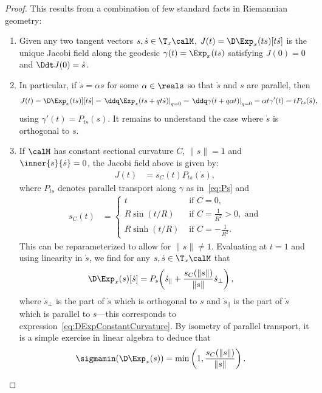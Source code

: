 \begin{proof}
	This results from a combination of few standard facts in Riemannian geometry:
	\begin{enumerate}
		\item \citep[Prop.~10.10]{lee2018riemannian} Given any two tangent vectors $s, \dot s \in \T_x\calM$, $J(t) = \D\Exp_x(ts)[t\dot s]$ is the unique Jacobi field along the geodesic $\gamma(t) = \Exp_x(ts)$ satisfying $J(0) = 0$ and $\Ddt J(0) = \dot s$.
		
		\item In particular, if $\dot s = \alpha s$ for some $\alpha \in \reals$ so that $\dot s$ and $s$ are parallel, then
		\begin{align*}
			J(t) & = \D\Exp_x(ts)][t\dot s] = \left. \ddq \Exp_x(ts + qt\dot s) \right|_{q=0} = \left. \ddq \gamma(t + q\alpha t) \right|_{q=0} = \alpha t \gamma'(t) = t P_{ts}(\dot s),
		\end{align*}
		using $\gamma'(t) = P_{ts}(s)$.
		It remains to understand the case where $\dot s$ is orthogonal to $s$.
		
		\item \citep[Prop.~10.12]{lee2018riemannian} If $\calM$ has constant sectional curvature $C$, $\|s\| = 1$ and $\inner{s}{\dot s} = 0$, the Jacobi field above is given by:
		\begin{align*}
			J(t) & = s_C(t) P_{ts}(\dot s),
		\end{align*}
		where $P_{ts}$ denotes parallel transport along $\gamma$ as in~\eqref{eq:Ps} and
		\begin{align*}
			s_C(t) & = \begin{cases}
				t & \textrm{ if } C = 0, \\
				R \sin(t/R) & \textrm{ if } C = \frac{1}{R^2} > 0, \textrm{ and} \\
				R \sinh(t/R) & \textrm{ if } C = -\frac{1}{R^2}.
			\end{cases}
		\end{align*}
		This can be reparameterized to allow for $\|s\| \neq 1$.
		Evaluating at $t = 1$ and using linearity in $\dot s$, we find for any $s, \dot s \in \T_x\calM$ that
		\begin{align}
			\D\Exp_x(s)[\dot s] & = P_s\!\left(\dot s_\parallel + \frac{s_C(\|s\|)}{\|s\|} \dot s_\perp \right),
		\end{align}
		where $\dot s_\perp$ is the part of $\dot s$ which is orthogonal to $s$ and $\dot s_\parallel$ is the part of $\dot s$ which is parallel to $s$---this corresponds to expression~\eqref{eq:DExpConstantCurvature}. By isometry of parallel transport, it is a simple exercise in linear algebra to deduce that
		\begin{align*}
			\sigmamin(\D\Exp_x(s)) & = \min\left( 1,  \frac{s_C(\|s\|)}{\|s\|} \right).
		\end{align*}
		

\end{enumerate}
\end{proof}
